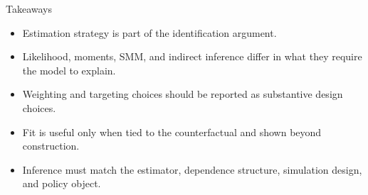 \documentclass[aspectratio=169,11pt]{beamer}
\newcommand{\1}{\mathbf{1}}
\begin{document}
\begin{frame}{Takeaways}
\begin{itemize}
    \item Estimation strategy is part of the identification argument.
    \item Likelihood, moments, SMM, and indirect inference differ in what they require the model to explain.
    \item Weighting and targeting choices should be reported as substantive design choices.
    \item Fit is useful only when tied to the counterfactual and shown beyond construction.
    \item Inference must match the estimator, dependence structure, simulation design, and policy object.
\end{itemize}
\end{frame}
\end{document}
